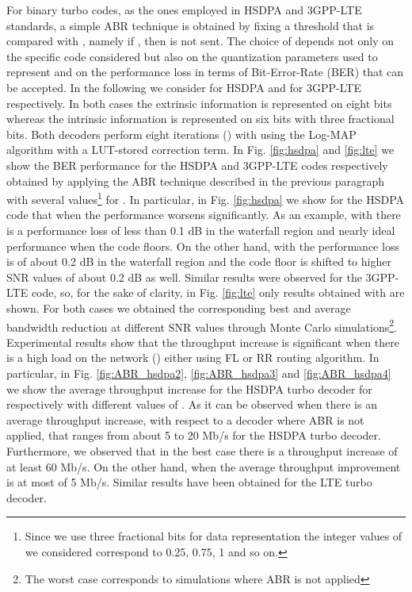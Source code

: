 \documentclass[10pt,twocolumn,journal]{IEEEtran}
\begin{document}
For binary turbo codes, as the ones employed in HSDPA and 3GPP-LTE standards, a simple ABR technique is obtained 
by fixing a threshold  that is compared with , namely  
if , then  is not sent. The choice of  depends not only on the specific code 
considered but also on the quantization parameters used to represent  and on the performance 
loss in terms of Bit-Error-Rate (BER) that can be accepted. In the following we consider  for HSDPA and 
 for 3GPP-LTE respectively. In both cases the extrinsic information is represented on eight bits whereas 
the intrinsic information is represented on six bits with three fractional bits. Both decoders perform eight iterations 
() with  using the Log-MAP algorithm \cite{robertson_ETT97} with a LUT-stored correction term. 
In Fig. \ref{fig:hsdpa} and \ref{fig:lte} we show the BER performance for the HSDPA and 3GPP-LTE codes 
respectively obtained by applying the ABR technique described in the previous paragraph with several 
values\footnote{Since we use three fractional bits for data representation the integer values of  we 
considered correspond to 0.25, 0.75, 1 and so on.} for . 
In particular, in Fig. \ref{fig:hsdpa} we show for the HSDPA code that when  the performance 
worsens significantly. As an example, with  there is a performance loss of less than 0.1 dB in the waterfall 
region and nearly ideal performance when the code floors. 
On the other hand, with  the performance loss is of about 0.2 dB in the waterfall region and the code floor is 
shifted to higher SNR values of about 0.2 dB as well.
Similar results were observed for the 3GPP-LTE code, so, for the sake of clarity, in Fig. 
\ref{fig:lte} only results obtained with  are shown. 
For both cases we obtained the corresponding best and average bandwidth reduction at different SNR values through 
Monte Carlo simulations\footnote{The worst case corresponds to simulations where ABR is not applied}.
Experimental results show that the throughput increase is significant when there is a high load on the network () 
either using FL or RR routing algorithm. 
In particular, in Fig. \ref{fig:ABR_hsdpa2}, \ref{fig:ABR_hsdpa3} and \ref{fig:ABR_hsdpa4} we show the average 
throughput increase for the HSDPA turbo decoder for  respectively with different values of . 
As it can be observed 
when  there is an average throughput increase, with respect to a decoder where ABR is not applied,  
that ranges from about 5 to 20 Mb/s for the HSDPA turbo decoder. 
Furthermore, we observed that in the best case there is a throughput increase of at least 60 Mb/s. 
On the other hand, when  the average throughput improvement is at most of 5 Mb/s.
Similar results have been obtained for the LTE turbo decoder.
\end{document}

